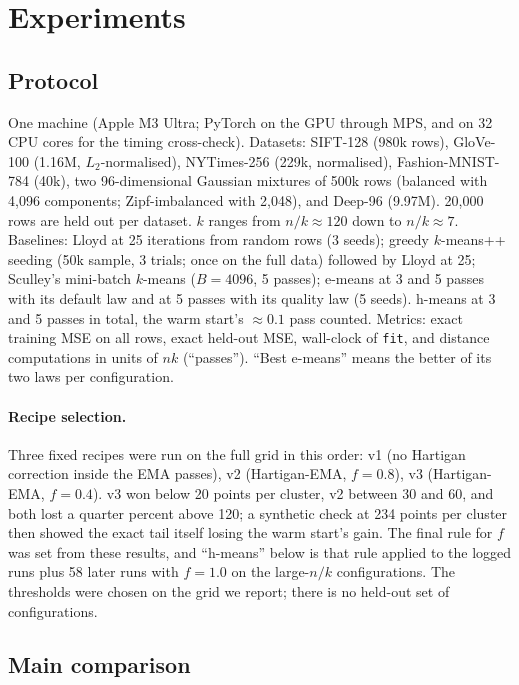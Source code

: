 \documentclass[11pt]{article}
\newcommand{\hm}{h-means}
\newcommand{\emeans}{e-means}
\newcommand{\nk}{n/k}
\begin{document}
\section{Experiments}

\subsection{Protocol}

One machine (Apple M3 Ultra; PyTorch on the GPU through MPS, and on 32 CPU cores for the timing cross-check). Datasets: SIFT-128 (980k rows), GloVe-100 (1.16M, $L_2$-normalised), NYTimes-256 (229k, normalised), Fashion-MNIST-784 (40k), two 96-dimensional Gaussian mixtures of 500k rows (balanced with 4,096 components; Zipf-imbalanced with 2,048), and Deep-96 (9.97M). 20,000 rows are held out per dataset. $k$ ranges from $\nk \approx 120$ down to $\nk \approx 7$. Baselines: Lloyd at 25 iterations from random rows (3 seeds); greedy $k$-means++ seeding (50k sample, 3 trials; once on the full data) followed by Lloyd at 25; Sculley's mini-batch $k$-means \cite{sculley} ($B=4096$, 5 passes); \emeans{} at 3 and 5 passes with its default law and at 5 passes with its quality law (5 seeds). \hm{} at 3 and 5 passes in total, the warm start's $\approx 0.1$ pass counted. Metrics: exact training MSE on all rows, exact held-out MSE, wall-clock of \texttt{fit}, and distance computations in units of $nk$ (``passes''). ``Best \emeans'' means the better of its two laws per configuration.

\paragraph{Recipe selection.} Three fixed recipes were run on the full grid in this order: v1 (no Hartigan correction inside the EMA passes), v2 (Hartigan-EMA, $f=0.8$), v3 (Hartigan-EMA, $f=0.4$). v3 won below 20 points per cluster, v2 between 30 and 60, and both lost a quarter percent above 120; a synthetic check at 234 points per cluster then showed the exact tail itself losing the warm start's gain. The final rule for $f$ was set from these results, and ``\hm'' below is that rule applied to the logged runs plus 58 later runs with $f=1.0$ on the large-$\nk$ configurations. The thresholds were chosen on the grid we report; there is no held-out set of configurations.

\subsection{Main comparison}
\end{document}
